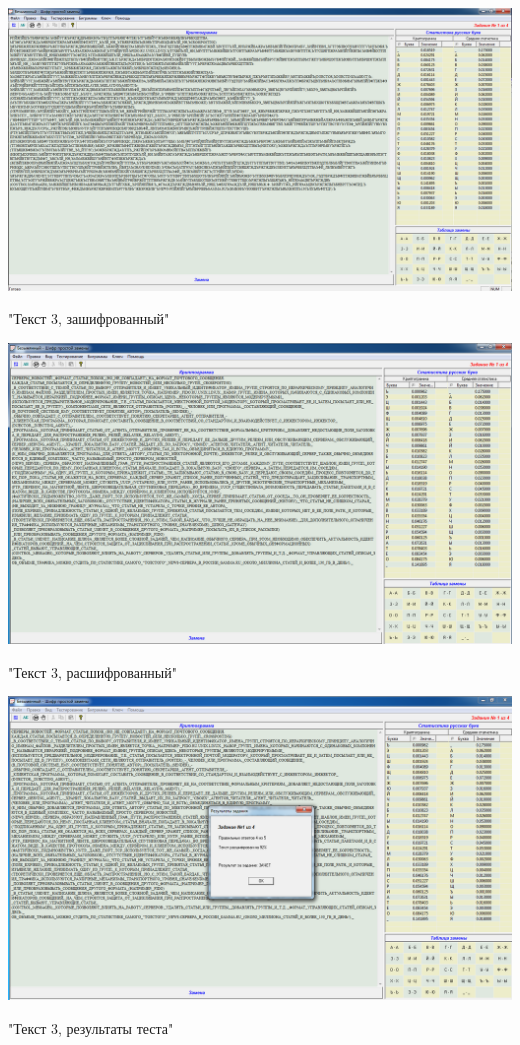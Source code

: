 \documentclass[a4paper,14pt]{extarticle}
\begin{document}
    \begin{center}
        \includegraphics[scale=0.3]{pics/3.png}

        "Текст 3, зашифрованный"
    \end{center}
    \begin{center}
        \includegraphics[scale=0.3]{pics/3_1.png}

        "Текст 3, расшифрованный"
    \end{center}
    \begin{center}
        \includegraphics[scale=0.3]{pics/3_2.png}

        "Текст 3, результаты теста"
    \end{center}
\end{document}
